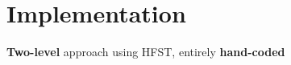 \documentclass[a0paper,fleqn]{betterposter}
\newcommand{\bigtext}[1]{{\fontsize{52pt}{56pt}\selectfont #1}}
\begin{document}
{}{

\section{Implementation}
\textbf{Two-level} approach using HFST, entirely \textbf{hand-coded}\\


}
\end{document}
